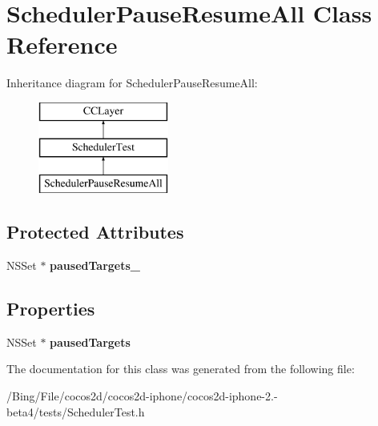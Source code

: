 \hypertarget{interface_scheduler_pause_resume_all}{\section{Scheduler\-Pause\-Resume\-All Class Reference}
\label{interface_scheduler_pause_resume_all}
}
Inheritance diagram for Scheduler\-Pause\-Resume\-All\-:\begin{figure}[H]
\begin{center}
\leavevmode
\includegraphics[height=3.000000cm]{interface_scheduler_pause_resume_all}
\end{center}
\end{figure}
\subsection*{Protected Attributes}
\begin{DoxyCompactItemize}
\item 
\hypertarget{interface_scheduler_pause_resume_all_a17add9865e0a777d03f2b66fd7206607}{N\-S\-Set $\ast$ {\bfseries paused\-Targets\-\_\-}}\label{interface_scheduler_pause_resume_all_a17add9865e0a777d03f2b66fd7206607}

\end{DoxyCompactItemize}
\subsection*{Properties}
\begin{DoxyCompactItemize}
\item 
\hypertarget{interface_scheduler_pause_resume_all_a2e304b915ac36d161b934138266026d9}{N\-S\-Set $\ast$ {\bfseries paused\-Targets}}\label{interface_scheduler_pause_resume_all_a2e304b915ac36d161b934138266026d9}

\end{DoxyCompactItemize}


The documentation for this class was generated from the following file\-:\begin{DoxyCompactItemize}
\item 
/\-Bing/\-File/cocos2d/cocos2d-\/iphone/cocos2d-\/iphone-\/2.-\/beta4/tests/Scheduler\-Test.\-h\end{DoxyCompactItemize}
